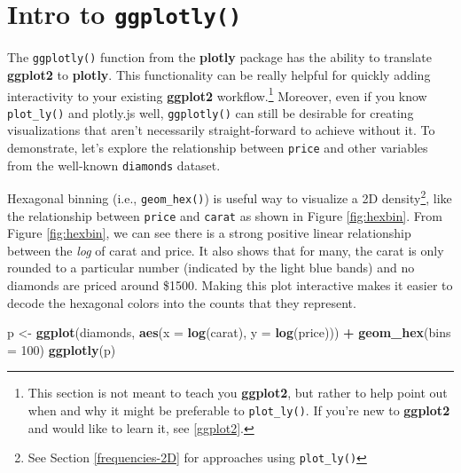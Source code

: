 \documentclass[
  12pt,
]{krantz}
\newenvironment{Shaded}{\begin{snugshade}}{\end{snugshade}}
\newcommand{\DataTypeTok}[1]{\textcolor[rgb]{0.13,0.29,0.53}{#1}}
\newcommand{\DecValTok}[1]{\textcolor[rgb]{0.00,0.00,0.81}{#1}}
\newcommand{\KeywordTok}[1]{\textcolor[rgb]{0.13,0.29,0.53}{\textbf{#1}}}
\newcommand{\NormalTok}[1]{#1}
\newcommand{\OperatorTok}[1]{\textcolor[rgb]{0.81,0.36,0.00}{\textbf{#1}}}
\newcommand{\StringTok}[1]{\textcolor[rgb]{0.31,0.60,0.02}{#1}}
\begin{document}
\hypertarget{intro-ggplotly}{%
\section{\texorpdfstring{Intro to \texttt{ggplotly()}}{Intro to ggplotly()}}\label{intro-ggplotly}}


The \texttt{ggplotly()} function from the \textbf{plotly} package has the ability to translate \textbf{ggplot2} to \textbf{plotly}. This functionality can be really helpful for quickly adding interactivity to your existing \textbf{ggplot2} workflow.\footnote{This section is not meant to teach you \textbf{ggplot2}, but rather to help point out when and why it might be preferable to \texttt{plot\_ly()}. If you're new to \textbf{ggplot2} and would like to learn it, see \ref{ggplot2}.} Moreover, even if you know \texttt{plot\_ly()} and plotly.js well, \texttt{ggplotly()} can still be desirable for creating visualizations that aren't necessarily straight-forward to achieve without it. To demonstrate, let's explore the relationship between \texttt{price} and other variables from the well-known \texttt{diamonds} dataset.

Hexagonal binning (i.e., \texttt{geom\_hex()}) is useful way to visualize a 2D density\footnote{See Section \ref{frequencies-2D} for approaches using \texttt{plot\_ly()}}, like the relationship between \texttt{price} and \texttt{carat} as shown in Figure \ref{fig:hexbin}. From Figure \ref{fig:hexbin}, we can see there is a strong positive linear relationship between the \emph{log} of carat and price. It also shows that for many, the carat is only rounded to a particular number (indicated by the light blue bands) and no diamonds are priced around \$1500. Making this plot interactive makes it easier to decode the hexagonal colors into the counts that they represent.

\begin{Shaded}
\begin{Highlighting}[]
\NormalTok{p <-}\StringTok{ }\KeywordTok{ggplot}\NormalTok{(diamonds, }\KeywordTok{aes}\NormalTok{(}\DataTypeTok{x =} \KeywordTok{log}\NormalTok{(carat), }\DataTypeTok{y =} \KeywordTok{log}\NormalTok{(price))) }\OperatorTok{+}\StringTok{ }
\StringTok{  }\KeywordTok{geom_hex}\NormalTok{(}\DataTypeTok{bins =} \DecValTok{100}\NormalTok{)}
\KeywordTok{ggplotly}\NormalTok{(p)}
\end{Highlighting}
\end{Shaded}
\end{document}
